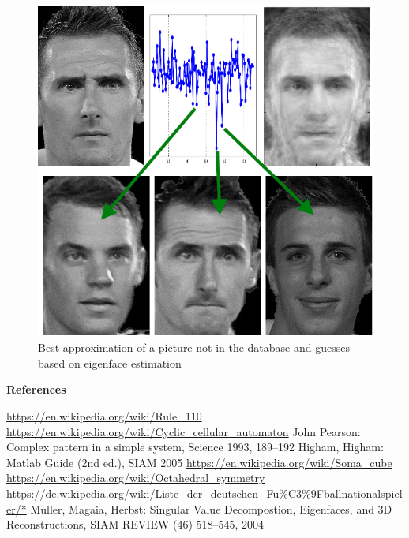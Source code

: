 \documentclass{beamer}
\def\sect#1{\textbf{\color{blue} #1}}
\begin{document}
\begin{frame}[t]{}
\begin{multicols}{5}
\begin{figure}
\includegraphics[height=0.93\hsize]{KloseGuess.png} 
\caption{Best approximation of a picture not in the database and guesses based
         on eigenface estimation
        }
\end{figure}

\medskip

\sect{References}

\begin{thebibliography}{1}
 \url{https://en.wikipedia.org/wiki/Rule_110}
     \url{https://en.wikipedia.org/wiki/Cyclic_cellular_automaton}
 John Pearson: Complex pattern in a simple system, Science 1993, 189--192
 Higham, Higham: Matlab Guide (2nd ed.), SIAM 2005
 \url{https://en.wikipedia.org/wiki/Soma_cube}
 \url{https://en.wikipedia.org/wiki/Octahedral_symmetry}
 \url{https://de.wikipedia.org/wiki/Liste_der_deutschen_Fu\%C3\%9Fballnationalspieler/*}
 Muller, Magaia, Herbst: Singular Value Decompostion, Eigenfaces,
               and 3D Reconstructions, SIAM REVIEW (46) 518--545, 2004
\end{thebibliography}

\end{multicols}
\end{frame}
\end{document}
